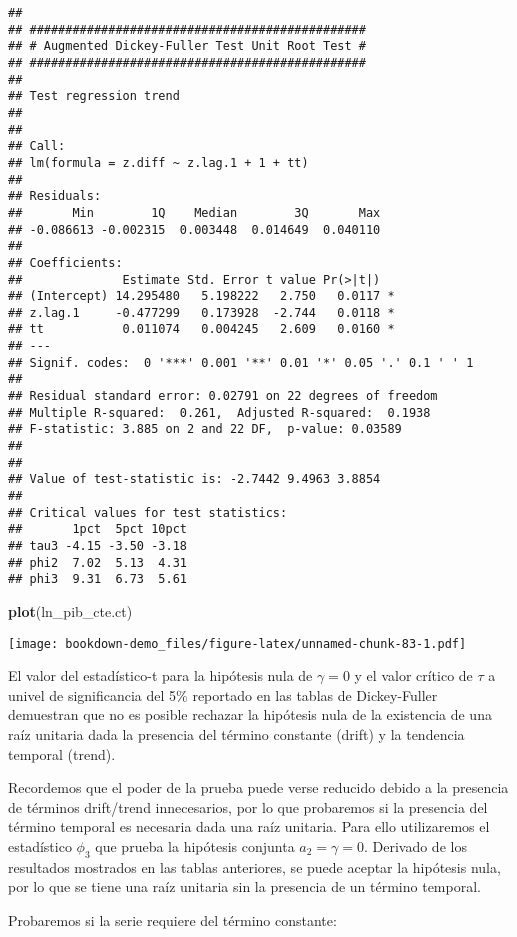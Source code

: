 \documentclass[]{book}
\newenvironment{Shaded}{\begin{snugshade}}{\end{snugshade}}
\newcommand{\KeywordTok}[1]{\textcolor[rgb]{0.13,0.29,0.53}{\textbf{#1}}}
\newcommand{\NormalTok}[1]{#1}
\theoremstyle{definition}
\theoremstyle{definition}
\theoremstyle{definition}
\theoremstyle{remark}
\begin{document}
\begin{verbatim}
## 
## ############################################### 
## # Augmented Dickey-Fuller Test Unit Root Test # 
## ############################################### 
## 
## Test regression trend 
## 
## 
## Call:
## lm(formula = z.diff ~ z.lag.1 + 1 + tt)
## 
## Residuals:
##       Min        1Q    Median        3Q       Max 
## -0.086613 -0.002315  0.003448  0.014649  0.040110 
## 
## Coefficients:
##              Estimate Std. Error t value Pr(>|t|)  
## (Intercept) 14.295480   5.198222   2.750   0.0117 *
## z.lag.1     -0.477299   0.173928  -2.744   0.0118 *
## tt           0.011074   0.004245   2.609   0.0160 *
## ---
## Signif. codes:  0 '***' 0.001 '**' 0.01 '*' 0.05 '.' 0.1 ' ' 1
## 
## Residual standard error: 0.02791 on 22 degrees of freedom
## Multiple R-squared:  0.261,  Adjusted R-squared:  0.1938 
## F-statistic: 3.885 on 2 and 22 DF,  p-value: 0.03589
## 
## 
## Value of test-statistic is: -2.7442 9.4963 3.8854 
## 
## Critical values for test statistics: 
##       1pct  5pct 10pct
## tau3 -4.15 -3.50 -3.18
## phi2  7.02  5.13  4.31
## phi3  9.31  6.73  5.61
\end{verbatim}

\begin{Shaded}
\begin{Highlighting}[]
\KeywordTok{plot}\NormalTok{(ln_pib_cte.ct)}
\end{Highlighting}
\end{Shaded}

\texttt{[image: bookdown-demo\_files/figure-latex/unnamed-chunk-83-1.pdf]}

El valor del estadístico-t para la hipótesis nula de \(\gamma=0\) y el
valor crítico de \(\tau\) a univel de significancia del 5\% reportado en
las tablas de Dickey-Fuller demuestran que no es posible rechazar la
hipótesis nula de la existencia de una raíz unitaria dada la presencia
del término constante (drift) y la tendencia temporal (trend).

Recordemos que el poder de la prueba puede verse reducido debido a la
presencia de términos drift/trend innecesarios, por lo que probaremos si
la presencia del término temporal es necesaria dada una raíz unitaria.
Para ello utilizaremos el estadístico \(\phi_3\) que prueba la hipótesis
conjunta \(a_2=\gamma=0\). Derivado de los resultados mostrados en las
tablas anteriores, se puede aceptar la hipótesis nula, por lo que se
tiene una raíz unitaria sin la presencia de un término temporal.

Probaremos si la serie requiere del término constante:
\end{document}
